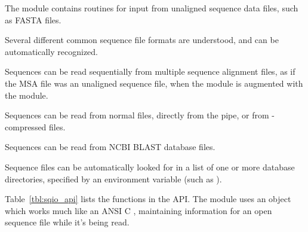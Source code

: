 The  module contains routines for input from unaligned
sequence data files, such as FASTA files.

Several different common sequence file formats are understood, and can
be automatically recognized.

Sequences can be read sequentially from multiple sequence alignment
files, as if the MSA file was an unaligned sequence file, when the
module is augmented with the  module.

Sequences can be read from normal files, directly from the
 pipe, or from -compressed files.

Sequences can be read from NCBI BLAST database files.

Sequence files can be automatically looked for in a list of one or
more database directories, specified by an environment variable (such
as ).

Table~\ref{tbl:sqio_api} lists the functions in the  API.
The module uses an  object which works much like an
ANSI C , maintaining information for an open sequence file
while it's being read.

